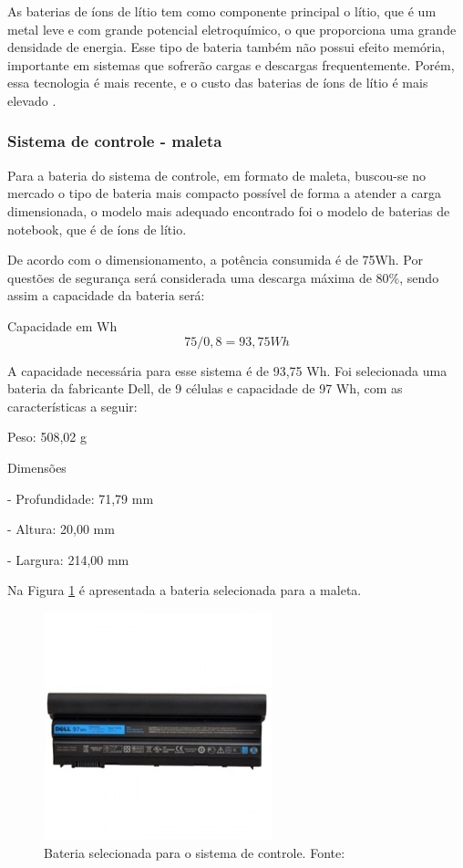 As baterias de íons de lítio tem como componente principal o lítio, que é um metal leve e com grande potencial eletroquímico, o que proporciona uma grande densidade de energia. Esse tipo de bateria também não possui efeito memória, importante em sistemas que sofrerão cargas e descargas frequentemente. Porém, essa tecnologia é mais recente, e o custo das baterias de íons de lítio é mais elevado \cite{baterias}. 

\subsubsection{Sistema de controle - maleta} 

Para a bateria do sistema de controle, em formato de maleta, buscou-se no mercado o tipo de bateria mais compacto possível de forma a atender a carga dimensionada, o modelo mais adequado encontrado foi o modelo de baterias de notebook, que é de íons de lítio. 

De acordo com o dimensionamento, a potência consumida é de 75Wh. Por questões de segurança será considerada uma descarga máxima de 80\%, sendo assim a capacidade da bateria será:

Capacidade em Wh
\begin{equation}
    75/0,8 = 93,75 Wh
\end{equation}

A capacidade necessária para esse sistema é de 93,75 Wh. Foi selecionada uma bateria da fabricante Dell, de 9 células e capacidade de 97 Wh, com as características a seguir:

Peso: 508,02 g

Dimensões

- Profundidade: 71,79 mm 

- Altura: 20,00 mm 

- Largura: 214,00 mm  


Na Figura \ref{fig:bateriamaleta} é apresentada a bateria selecionada para a maleta.

\begin{figure}[!h]
	\centering
		\includegraphics[keepaspectratio=true,scale=1]{figuras/bateria_maleta.jpg}
	\caption{Bateria selecionada para o sistema de controle. Fonte: \cite{figura_bateria_maleta}} 
	\label{fig:bateriamaleta}
	\end{figure}

